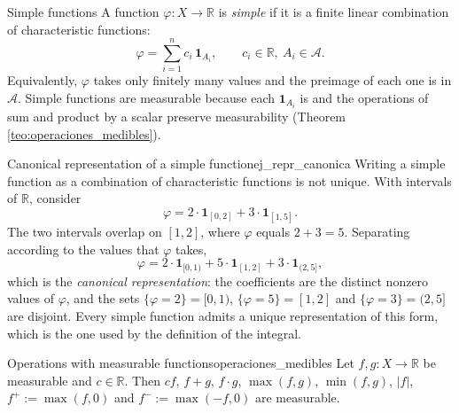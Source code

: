 \documentclass[11pt, a4paper]{article}
\begin{document}
\begin{ejemplo}{Simple functions}{}
A function $\varphi: X \to \mathbb{R}$ is \emph{simple} if it is a finite linear combination of
characteristic functions:
$$ \varphi = \sum_{i=1}^n c_i \, \mathbf{1}_{A_i}, \qquad c_i \in \mathbb{R}, \ A_i \in \mathcal{A}.
$$
Equivalently, $\varphi$ takes only finitely many values and the preimage of each one is in
$\mathcal{A}$. Simple functions are measurable because each $\mathbf{1}_{A_i}$ is and the operations of
sum and product by a scalar preserve measurability (Theorem \ref{teo:operaciones_medibles}).
\end{ejemplo}

\begin{ejemplo}{Canonical representation of a simple function}{ej_repr_canonica}
Writing a simple function as a combination of characteristic functions is not unique. With intervals of
$\mathbb{R}$, consider
$$ \varphi = 2 \cdot \mathbf{1}_{[0,2]} + 3 \cdot \mathbf{1}_{[1,5]}. $$
The two intervals overlap on $[1,2]$, where $\varphi$ equals $2 + 3 = 5$. Separating according to
the values that $\varphi$ takes,
$$ \varphi = 2 \cdot \mathbf{1}_{[0,1)} + 5 \cdot \mathbf{1}_{[1,2]} + 3 \cdot \mathbf{1}_{(2,5]},
$$
which is the \emph{canonical representation}: the coefficients are the distinct nonzero values
of $\varphi$, and the sets $\{\varphi = 2\} = [0,1)$, $\{\varphi = 5\} = [1,2]$ and
$\{\varphi = 3\} = (2,5]$ are disjoint. Every simple function admits a unique representation of this
form, which is the one used by the definition of the integral.
\end{ejemplo}

\begin{teorema}{Operations with measurable functions}{operaciones_medibles}
Let $f, g: X \to \mathbb{R}$ be measurable and $c \in \mathbb{R}$. Then $cf$, $f + g$, $f \cdot g$,
$\max(f, g)$, $\min(f, g)$, $|f|$, $f^+ := \max(f, 0)$ and $f^- := \max(-f, 0)$ are measurable.
\end{teorema}
\end{document}
